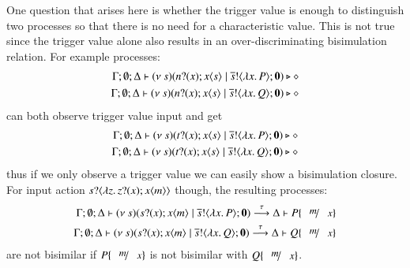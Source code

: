 One question that arises here is whether the trigger value is enough
to distinguish two processes so that there is no need for a
characteristic value. This is not true since the trigger value
alone also results in an over-discriminating bisimulation relation.
For example processes:
%
\begin{eqnarray*}
	\Gamma; \emptyset; \Delta \vdash (\nu\ s)(n ? (x) ; x\langle s \rangle \;|\; \overline{s} ! \langle \lambda x.\,P \rangle ; \mathbf{0}) \triangleright \diamond
	\\
	\Gamma; \emptyset; \Delta \vdash (\nu\ s)(n ? (x) ; x\langle s \rangle \;|\; \overline{s} ! \langle \lambda x.\,Q \rangle ; \mathbf{0}) \triangleright \diamond
\end{eqnarray*}
%
\noi can both observe trigger value input and get
%
\begin{eqnarray*}
	\Gamma; \emptyset; \Delta \vdash (\nu\ s)(t ? (x) ; x\langle s \rangle \;|\; \overline{s} ! \langle \lambda x.\,P \rangle ; \mathbf{0}) \triangleright \diamond
	\\
	\Gamma; \emptyset; \Delta \vdash (\nu\ s)(t ? (x) ; x\langle s \rangle \;|\; \overline{s} ! \langle \lambda x.\,Q \rangle ; \mathbf{0}) \triangleright \diamond
\end{eqnarray*}
%
\noi thus if we only observe a trigger value we can easily show a bisimulation closure.
For input action $s ? \langle \lambda z.\,z ? (x) ; x\langle m \rangle \rangle$
though, the resulting processes:
\begin{eqnarray*}
	\Gamma; \es; \Delta \proves \newsp{s}{\binp{s}{x} \appl{x}{m} \Par \bout{\dual{s}}{\abs{x} P} \inact} \by{\tau} \Delta \proves P \subst{m}{x}
	\\
	\Gamma; \es; \Delta \proves \newsp{s}{\binp{s}{x} \appl{x}{m} \Par \bout{\dual{s}}{\abs{x} Q} \inact} \by{\tau} \Delta \proves Q \subst{m}{x}
\end{eqnarray*}
\noi are not bisimilar if $P \subst{m}{x}$ is not bisimilar with $Q \subst{m}{x}$.

